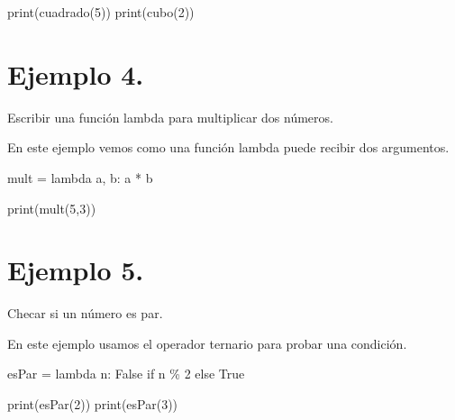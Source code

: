 \documentclass[
  letterpaper,
  DIV=11,
  numbers=noendperiod]{scrreprt}
\newenvironment{Shaded}{\begin{snugshade}}{\end{snugshade}}
\newcommand{\BuiltInTok}[1]{\textcolor[rgb]{0.00,0.23,0.31}{#1}}
\newcommand{\ControlFlowTok}[1]{\textcolor[rgb]{0.00,0.23,0.31}{#1}}
\newcommand{\DecValTok}[1]{\textcolor[rgb]{0.68,0.00,0.00}{#1}}
\newcommand{\KeywordTok}[1]{\textcolor[rgb]{0.00,0.23,0.31}{#1}}
\newcommand{\NormalTok}[1]{\textcolor[rgb]{0.00,0.23,0.31}{#1}}
\newcommand{\OperatorTok}[1]{\textcolor[rgb]{0.37,0.37,0.37}{#1}}
\newcommand{\VariableTok}[1]{\textcolor[rgb]{0.07,0.07,0.07}{#1}}
\begin{document}
\begin{Shaded}
\begin{Highlighting}[]
\BuiltInTok{print}\NormalTok{(cuadrado(}\DecValTok{5}\NormalTok{))}
\BuiltInTok{print}\NormalTok{(cubo(}\DecValTok{2}\NormalTok{))}
\end{Highlighting}
\end{Shaded}

\section{\texorpdfstring{\textbf{Ejemplo
4.}}{Ejemplo 4.}}\label{ejemplo-4.}

Escribir una función lambda para multiplicar dos números.

En este ejemplo vemos como una función lambda puede recibir dos
argumentos.

\begin{Shaded}
\begin{Highlighting}[]
\NormalTok{mult }\OperatorTok{=} \KeywordTok{lambda}\NormalTok{ a, b: a }\OperatorTok{*}\NormalTok{ b}
\end{Highlighting}
\end{Shaded}

\begin{Shaded}
\begin{Highlighting}[]
\BuiltInTok{print}\NormalTok{(mult(}\DecValTok{5}\NormalTok{,}\DecValTok{3}\NormalTok{))}
\end{Highlighting}
\end{Shaded}

\section{\texorpdfstring{\textbf{Ejemplo
5.}}{Ejemplo 5.}}\label{ejemplo-5.}

Checar si un número es par.

En este ejemplo usamos el operador ternario para probar una condición.

\begin{Shaded}
\begin{Highlighting}[]
\NormalTok{esPar }\OperatorTok{=} \KeywordTok{lambda}\NormalTok{ n: }\VariableTok{False} \ControlFlowTok{if}\NormalTok{ n }\OperatorTok{\%} \DecValTok{2} \ControlFlowTok{else} \VariableTok{True}
\end{Highlighting}
\end{Shaded}

\begin{Shaded}
\begin{Highlighting}[]
\BuiltInTok{print}\NormalTok{(esPar(}\DecValTok{2}\NormalTok{))}
\BuiltInTok{print}\NormalTok{(esPar(}\DecValTok{3}\NormalTok{))}
\end{Highlighting}
\end{Shaded}
\end{document}
